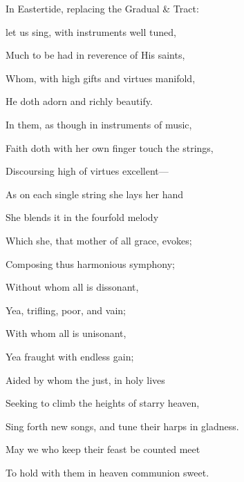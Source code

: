 
\begin{rubric}
{In Eastertide, replacing the Gradual \& Tract:}
\end{rubric}\par\noindent


\begin{multicols}{2}
 let us sing, with instruments well tuned,\par
{}
Much to be had in reverence of His saints,

Whom, with high gifts and virtues manifold,

He doth adorn and richly beautify.

In them, as though in instruments of music,

Faith doth with her own finger touch the strings,

Discoursing high of virtues excellent---

As on each single string she lays her hand

She blends it in the fourfold melody

Which she, that mother of all grace, evokes;

Composing thus harmonious symphony;

Without whom all is dissonant,

Yea, trifling, poor, and vain;

With whom all is unisonant,

Yea fraught with endless gain;

Aided by whom the just, in holy lives

Seeking to climb the heights of starry heaven,

Sing forth new songs, and tune their harps in gladness.

May we who keep their feast be counted meet

To hold with them in heaven communion sweet.
\end{multicols}


